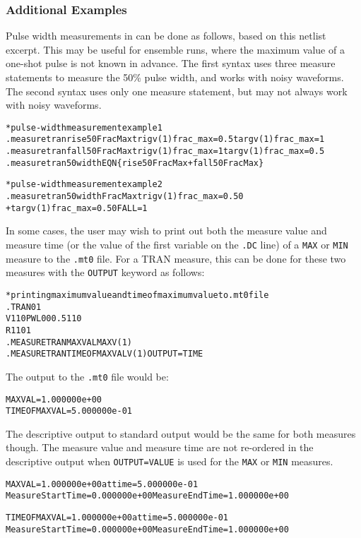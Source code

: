 \subsubsection{Additional Examples}
\label{Measure_Additional_Examples}
Pulse width measurements in \Xyce{} can be done as follows, based on
this netlist excerpt.  This may be useful for ensemble runs, where the
maximum value of a one-shot pulse is not known in advance.  The first
syntax uses three measure statements to measure the 50\% pulse width,
and works with noisy waveforms.  The second syntax uses only one
measure statement, but may not always work with noisy waveforms.

\begin{alltt}
* pulse-width measurement example 1
.measure tran rise50FracMax trig v(1) frac_max=0.5 targ v(1) frac_max=1
.measure tran fall50FracMax trig v(1) frac_max=1 targ v(1) frac_max=0.5
.measure tran 50width EQN\{rise50FracMax + fall50FracMax\}

* pulse-width measurement example 2
.measure tran 50widthFracMax trig v(1) frac_max=0.50
+ targ v(1) frac_max=0.50 FALL=1
\end{alltt}

In some cases, the user may wish to print out both the measure value
and measure time (or the value of the first variable on the {\tt .DC}
line) of a
\texttt{MAX} or \texttt{MIN} measure to the \texttt{.mt0} file.  For a TRAN measure,
this can be done for these two measures with the \texttt{OUTPUT}
keyword as follows:
\begin{alltt}
* printing maximum value and time of maximum value to .mt0 file
.TRAN 0 1
V1 1 0 PWL 0 0 0.5 1 1 0
R1 1 0 1
.MEASURE TRAN MAXVAL MAX V(1)
.MEASURE TRAN TIMEOFMAXVAL V(1) OUTPUT=TIME
\end{alltt}
The output to the \texttt{.mt0} file would be:
\begin{alltt}
MAXVAL = 1.000000e+00
TIMEOFMAXVAL = 5.000000e-01
\end{alltt}
The descriptive output to standard output would be the same for both
measures though.  The measure value and measure time are not
re-ordered in the descriptive output when \texttt{OUTPUT=VALUE} is
used for the \texttt{MAX} or
\texttt{MIN} measures.
\begin{alltt}
MAXVAL = 1.000000e+00 at time = 5.000000e-01
Measure Start Time= 0.000000e+00        Measure End Time= 1.000000e+00

TIMEOFMAXVAL = 1.000000e+00 at time = 5.000000e-01
Measure Start Time= 0.000000e+00        Measure End Time= 1.000000e+00
\end{alltt}

